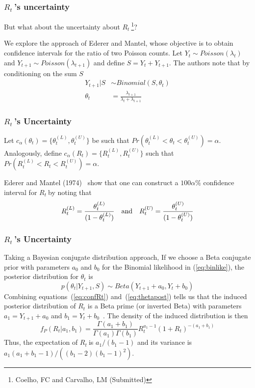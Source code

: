 \documentclass[10pt,compress,notheorems]{beamer}
\def \rr {$R_{t}\:$}
\begin{document}
\begin{frame}
\frametitle{\rr's uncertainty}
But what about the uncertainty about \rr\footnote{Coelho, FC and Carvalho, LM 
(Submitted)}?

We explore the approach of Ederer and Mantel\cite{mantel}, whose objective is 
to obtain 
confidence intervals for the ratio of two Poisson counts. 
Let $Y_{t} \sim Poisson(\lambda_t)$ and $Y_{t+1} \sim Poisson(\lambda_{t+1})$ 
and define $S = Y_{t} + Y_{t+1}$.
The authors note that by conditioning on the sum $S$
\begin{align}
\label{eq:binlike}
Y_{t+1} | S &\sim Binomial(S, \theta_t) \\
\theta_t &= \frac{\lambda_{t+1}}{\lambda_{t} + \lambda_{t+1}}
\end{align}
\end{frame}

\begin{frame}
\frametitle{\rr's Uncertainty}
Let $c_{\alpha}(\theta_t) = \{\theta_t^{(L)} , \theta_t^{(U)} \}$ be such that 
$Pr(\theta_t^{(L)}<\theta_t <\theta_t^{(U)}) = \alpha$.
Analogously, define $c_{\alpha}(R_t) = \{R_t^{(L)} , R_t^{(U)} \}$ such that 
$Pr(R_t^{(L)}<R_t<R_t^{(U)}) = \alpha$.

Ederer and Mantel (1974)~\cite{mantel} show that one can construct a $100\alpha 
\%$ confidence interval for \rr by noting that
\begin{equation}
\label{eq:confRt}
 R_t^{(L)} = \frac{\theta_t^{(L)}}{(1-\theta_t^{(L)})} \quad \text{and} \quad 
R_t^{(U)} = \frac{\theta_t^{(U)}}{(1-\theta_t^{(U)})}\\
\end{equation}
\end{frame}

\begin{frame}
\frametitle{\rr's Uncertainty}
Taking a Bayesian conjugate distribution approach, If we choose a
Beta conjugate prior with parameters $a_0$ and $b_0$ for the 
Binomial likelihood in (\ref{eq:binlike}), the posterior distribution for 
$\theta_t$ is
\begin{equation}
\label{eq:thetapost}
p(\theta_t| Y_{t+1}, S) \sim Beta(Y_{t+1} + a_0, Y_t + b_0)
\end{equation}
Combining equations~(\ref{eq:confRt}) and~(\ref{eq:thetapost}) 
tells us that the induced posterior distribution of $R_t$ is 
a Beta prime (or inverted Beta) with parameters $ a_1 = Y_{t+1} + a_0$ and $b_1 
=  Y_t + b_0$~\cite{dubey1970}.
The density of the induced distribution is then 
\begin{equation}
\label{eq:densityMantel}
f_P(R_t| a_1, b_1) = \frac{\Gamma(a_1 + b_1)}{\Gamma(a_1)\Gamma(b_1)} R_t^{a_1 
- 
1} (1 + R_t)^{-(a_1 + b_1)}
\end{equation}
Thus, the expectation of \rr is $a_1/(b_1 - 1)$ and its variance is 
$a_1(a_1 + b_1 - 1)/\left((b_1 - 2)(b_1 - 1)^2 \right) $.
\end{frame}
\end{document}
